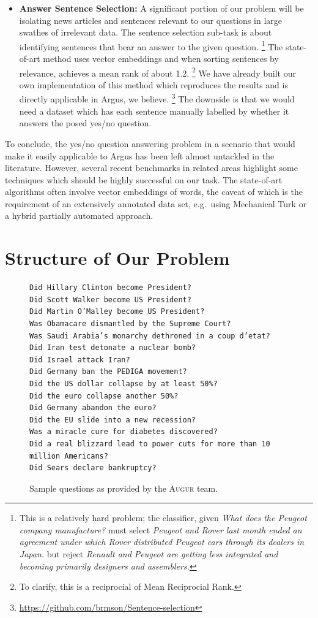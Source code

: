 \documentclass[11pt,a4paper]{article}
\begin{document}
\begin{itemize}
	\item \textbf{Answer Sentence Selection:} A significant portion
		of our problem will be isolating news articles
		and sentences relevant to our questions in large swathes
		of irrelevant data.  The sentence selection sub-task is
		about identifying sentences that bear an answer to the
		given question.%
\footnote{This is a relatively hard problem; the
		classifier, given \textit{What does the Peugeot company manufacture?}
		must select \textit{Peugeot and Rover last month ended an agreement under which Rover distributed Peugeot cars through its dealers in Japan.}
	but reject \textit{Renault and Peugeot are getting less integrated and becoming primarily designers and assemblers.}}
		The state-of-art method \citep{Yu2014Deep} uses vector embeddings
		and when sorting sentences by relevance, achieves a mean rank
		of about 1.2.%
\footnote{To clarify, this is a reciprocial of Mean Reciprocial Rank.}
		We have already built our own implementation of this method
		which reproduces the results and is directly applicable
		in Argus, we believe.%
\footnote{\url{https://github.com/brmson/Sentence-selection}}
		The downside is that we would need a dataset which has
		each sentence manually labelled by whether it answers
		the posed yes/no question.

\end{itemize}

To conclude, the yes/no question answering problem in a scenario that
would make it easily applicable to Argus has been left almost untackled
in the literature.  However, several recent benchmarks in related areas
highlight some techniques which should be highly successful on our task.
The state-of-art algorithms often involve vector embeddings of words,
the caveat of which is the requirement of an extensively annotated
data set, e.g.\ using Mechanical Turk or a hybrid partially automated
approach.

\section{Structure of Our Problem}
\label{structure}

\begin{figure}
\begin{verbatim}
Did Hillary Clinton become President?
Did Scott Walker become US President?
Did Martin O’Malley become US President?
Was Obamacare dismantled by the Supreme Court?
Was Saudi Arabia’s monarchy dethroned in a coup d’etat?
Did Iran test detonate a nuclear bomb?
Did Israel attack Iran?
Did Germany ban the PEDIGA movement?
Did the US dollar collapse by at least 50%?
Did the euro collapse another 50%?
Did Germany abandon the euro?
Did the EU slide into a new recession?
Was a miracle cure for diabetes discovered?
Did a real blizzard lead to power cuts for more than 10 million Americans?
Did Sears declare bankruptcy?
\end{verbatim}
	\caption{Sample questions as provided by the \textsc{Augur} team.}
	\label{fig:sampleq}
\end{figure}
\end{document}
